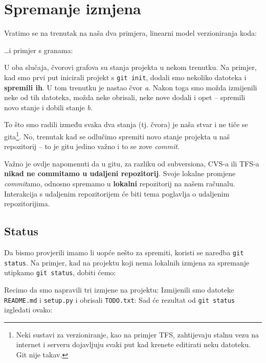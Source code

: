 \chapter*{Spremanje izmjena}

Vratimo se na trenutak na naša dva primjera, linearni model verzioniranja koda:



\dots{}i primjer s granama:



U oba slučaja, čvorovi grafova su stanja projekta u nekom trenutku.
Na primjer, kad smo prvi put inicirali projekt s \verb+git init+, dodali smo nekoliko datoteka i \textbf{spremili ih}. 
U tom trenutku je nastao čvor \emph a.
Nakon toga smo možda izmijenili neke od tih datoteka, možda neke obrisali, neke nove dodali i opet -- spremili novo stanje i dobili stanje \emph b.

To što smo radili između svaka dva stanja (tj. čvora) je naša stvar i ne tiče se gita\footnote{Neki sustavi za verzioniranje, kao na primjer TFS, zahtijevaju stalnu vezu na internet i serveru dojavljuju svaki put kad krenete editirati neku datoteku. Git nije takav.}.
No, trenutak kad se odlučimo spremiti novo stanje projekta u naš repozitorij -- to je gitu jedino važno i to se zove \emph{commit}.

Važno je ovdje napomenuti da u gitu, za razliku od subversiona, CVS-a ili TFS-a \textbf{nikad ne commitamo u udaljeni repozitorij}. 
Svoje lokalne promjene \emph{commit}amo, odnosno spremamo u \textbf{lokalni} repozitorij na našem računalu.
Interakcija s udaljenim repozitorijem će biti tema poglavlja o udaljenim repozitorijima.

\section*{Status}

Da bismo provjerili imamo li uopće nešto za spremiti, koristi se naredba \verb+git status+.
Na primjer, kad na projektu koji nema lokalnih izmjena za spremanje utipkamo \verb+git status+, dobiti ćemo:



Recimo da smo napravili tri izmjene na projektu:
Izmijenili smo datoteke \verb+README.md+ i \verb+setup.py+ i obrisali \verb+TODO.txt+:
Sad će rezultat od \verb+git status+ izgledati ovako:


